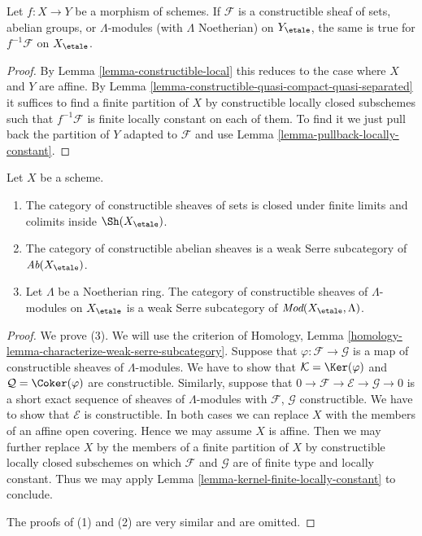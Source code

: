 \begin{lemma}
\label{lemma-pullback-constructible}
Let $f : X \to Y$ be a morphism of schemes. If $\mathcal{F}$ is a
constructible sheaf of sets, abelian groups, or $\Lambda$-modules
(with $\Lambda$ Noetherian) on $Y_\etale$, the same
is true for $f^{-1}\mathcal{F}$ on $X_\etale$.
\end{lemma}

\begin{proof}
By Lemma \ref{lemma-constructible-local} this reduces to the case
where $X$ and $Y$ are affine. By
Lemma \ref{lemma-constructible-quasi-compact-quasi-separated}
it suffices to find a finite partition of $X$ by constructible
locally closed subschemes such that $f^{-1}\mathcal{F}$ is finite locally
constant on each of them.
To find it we just pull back the partition of $Y$ adapted to
$\mathcal{F}$ and use
Lemma \ref{lemma-pullback-locally-constant}.
\end{proof}

\begin{lemma}
\label{lemma-constructible-abelian}
Let $X$ be a scheme.
\begin{enumerate}
\item The category of constructible sheaves of sets
is closed under finite limits and colimits inside $\Sh(X_\etale)$.
\item The category of constructible abelian sheaves is a
weak Serre subcategory of $\textit{Ab}(X_\etale)$.
\item Let $\Lambda$ be a Noetherian ring. The category of
constructible sheaves of $\Lambda$-modules on
$X_\etale$ is a weak Serre subcategory of
$\textit{Mod}(X_\etale, \Lambda)$.
\end{enumerate}
\end{lemma}

\begin{proof}
We prove (3). We will use the criterion of
Homology, Lemma \ref{homology-lemma-characterize-weak-serre-subcategory}.
Suppose that $\varphi : \mathcal{F} \to \mathcal{G}$
is a map of constructible sheaves of $\Lambda$-modules.
We have to show that $\mathcal{K} = \Ker(\varphi)$ and
$\mathcal{Q} = \Coker(\varphi)$ are constructible. 
Similarly, suppose that
$0 \to \mathcal{F} \to \mathcal{E} \to \mathcal{G} \to 0$
is a short exact sequence of sheaves of $\Lambda$-modules
with $\mathcal{F}$, $\mathcal{G}$ constructible. We have to show
that $\mathcal{E}$ is constructible.
In both cases we can replace $X$ with the members of an
affine open covering. Hence we may assume $X$ is affine.
Then we may further replace $X$ by the members of a finite
partition of $X$ by constructible locally closed subschemes
on which $\mathcal{F}$ and $\mathcal{G}$ are of finite type and
locally constant. Thus we may apply
Lemma \ref{lemma-kernel-finite-locally-constant} to conclude.

\medskip\noindent
The proofs of (1) and (2) are very similar and are omitted.
\end{proof}

